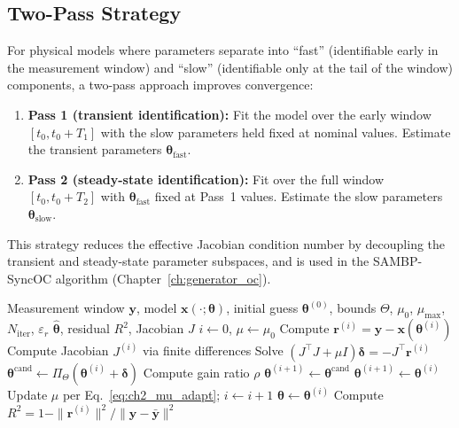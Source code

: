 \subsection{Two-Pass Strategy}

For physical models where parameters separate into ``fast'' (identifiable
early in the measurement window) and ``slow'' (identifiable only at the tail
of the window) components, a two-pass approach improves convergence:

\begin{enumerate}
\item \textbf{Pass 1 (transient identification):} Fit the model over the
      early window $[t_0, t_0 + T_1]$ with the slow parameters held fixed at
      nominal values. Estimate the transient parameters $\bm{\theta}_\mathrm{fast}$.
\item \textbf{Pass 2 (steady-state identification):} Fit over the full
      window $[t_0, t_0 + T_2]$ with $\bm{\theta}_\mathrm{fast}$ fixed at
      Pass~1 values. Estimate the slow parameters $\bm{\theta}_\mathrm{slow}$.
\end{enumerate}

This strategy reduces the effective Jacobian condition number by decoupling
the transient and steady-state parameter subspaces, and is used in
the SAMBP-SyncOC algorithm (Chapter~\ref{ch:generator_oc}).

\begin{algorithm}[htbp]
\caption{Levenberg--Marquardt Inverse Estimator}
\label{alg:ch2_lm}
\begin{algorithmic}[1]
\Require Measurement window $\mathbf{y}$, model $\mathbf{x}(\cdot;\bm{\theta})$,
         initial guess $\bm{\theta}^{(0)}$, bounds $\Theta$,
         $\mu_0$, $\mu_\mathrm{max}$, $N_\mathrm{iter}$, $\varepsilon_r$
\Ensure  $\hat{\bm{\theta}}$, residual $R^2$, Jacobian $J$
\State $i \gets 0$,\; $\mu \gets \mu_0$
  \State Compute $\mathbf{r}^{(i)} = \mathbf{y} - \mathbf{x}(\bm{\theta}^{(i)})$
  \State Compute Jacobian $J^{(i)}$ via finite differences
  \State Solve $(J^\top J + \mu I)\bm{\delta} = -J^\top \mathbf{r}^{(i)}$
  \State $\bm{\theta}^{\mathrm{cand}} \gets \Pi_\Theta(\bm{\theta}^{(i)} + \bm{\delta})$
  \State Compute gain ratio $\rho$ 
    \State $\bm{\theta}^{(i+1)} \gets \bm{\theta}^{\mathrm{cand}}$
  \Else
    \State $\bm{\theta}^{(i+1)} \gets \bm{\theta}^{(i)}$ 
  \EndIf
  \State Update $\mu$ per Eq.~\eqref{eq:ch2_mu_adapt};\; $i \gets i+1$
\EndWhile
\State $\hat{\bm{\theta}} \gets \bm{\theta}^{(i)}$
\State Compute $R^2 = 1 - \|\mathbf{r}^{(i)}\|^2 / \|\mathbf{y} - \bar{\mathbf{y}}\|^2$
\end{algorithmic}
\end{algorithm}

